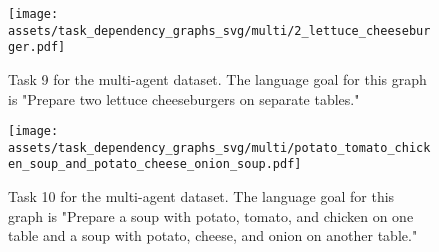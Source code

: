 \begin{figure}[H]
    \centering
    \texttt{[image: assets/task\_dependency\_graphs\_svg/multi/2\_lettuce\_cheeseburger.pdf]}
    \caption{Task 9 for the multi-agent dataset. The language goal for this graph is "Prepare two lettuce cheeseburgers on separate tables."}
    \label{8_multi}
\end{figure}

\begin{figure}[H]
    \centering
    \texttt{[image: assets/task\_dependency\_graphs\_svg/multi/potato\_tomato\_chicken\_soup\_and\_potato\_cheese\_onion\_soup.pdf]}
    \caption{Task 10 for the multi-agent dataset. The language goal for this graph is "Prepare a soup with potato, tomato, and chicken on one table and a soup with potato, cheese, and onion on another table."}
    \label{9_multi}
\end{figure}